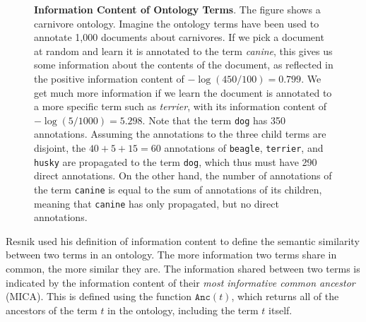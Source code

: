 \documentclass{article}
\begin{document}
\begin{figure}[ht!]

\caption[Information Content of Ontology Terms]{\textbf{Information Content 
    of Ontology Terms}. 
 The figure shows a carnivore ontology. Imagine the ontology terms 
 have been used to annotate 1,000 documents about carnivores. If we pick 
 a document at random and learn it is annotated to the term 
 \textit{canine}, this gives us some information about the contents of 
the document, as reflected in the positive information content of 
$-\log (450/100)=0.799$. We get much more information if we learn the 
document is annotated to a more specific term such as 
\textit{terrier}, with its information content of $-\log 
(5/1000)=5.298$. 
Note that the term \texttt{dog} has 350 annotations. Assuming the 
annotations to the three child terms are disjoint, the $40+5+15=60$ 
annotations of \texttt{beagle}, \texttt{terrier}, and \texttt{husky} 
are propagated to the term \texttt{dog}, which thus must have 290 
direct annotations. On the other hand, the number of annotations of 
the term \texttt{canine} is equal to the sum of annotations of its 
children, meaning that \texttt{canine} has only propagated, but no 
direct annotations. } 
\label{fig:ic} 
\end{figure} 
 
 
 
Resnik used his definition of information content to define the 
semantic similarity between two terms in an ontology. The more 
information two terms share in common, the more similar they 
are. The information shared between two terms is indicated by the 
information content of their  \emph{most 
informative common ancestor} (MICA). This is defined using the 
function $\mathtt{Anc}(t)$, which returns all of the ancestors of the 
term $t$ in the ontology, including the term $t$ 
itself.  
\label{page:definition-of-Anc} 
 
\end{document}
